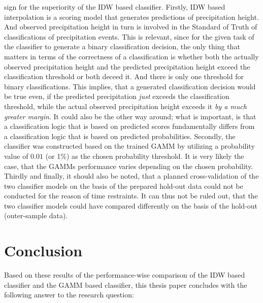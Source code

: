 \documentclass[
  12pt,
]{article}
\begin{document}
sign for the superiority of the IDW based classifier. Firstly, IDW based
interpolation is a scoring model that generates predictions of
precipitation height. And observed precipitation height in turn is
involved in the Standard of Truth of classifications of precipitation
events. This is relevant, since for the given task of the classifier to
generate a binary classification decision, the only thing that matters
in terms of the correctness of a classification is whether both the
actually observed precipitation height and the predicted precipitation
height exceed the classification threshold or both deceed it. And there
is only one threshold for binary classifications. This implies, that a
generated classification decision would be true even, if the predicted
precipitation \textit{just} exceeds the classification threshold, while
the actual observed precipitation height exceeds it
\textit{by a much greater margin}. It could also be the other way
around; what is important, is that a classification logic that is based
on predicted scores fundamentally differs from a classification logic
that is based on predicted probabilities. Secondly, the classifier was
constructed based on the trained GAMM by utilizing a probability value
of \(0.01\) (or 1\%) as the chosen probability threshold. It is very
likely the case, that the GAMMs performance varies depending on the
chosen probability. Thirdly and finally, it should also be noted, that a
planned cross-validation of the two classifier models on the basis of
the prepared hold-out data could not be conducted for the reason of time
restraints. It can thus not be ruled out, that the two classifier models
could have compared differently on the basis of the hold-out
(outer-sample data).

\hypertarget{conclusion}{%
\section{Conclusion}\label{conclusion}}

Based on these results of the performance-wise comparison of the IDW
based classifier and the GAMM based classifier, this thesis paper
concludes with the following answer to the research question:
\end{document}
